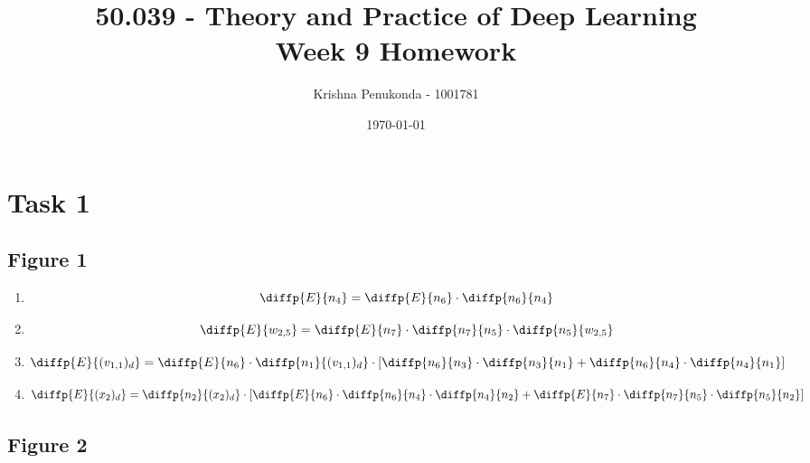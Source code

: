 \documentclass[9pt]{paper}
\title{
	50.039 -  Theory and Practice of Deep Learning\\
	Week 9 Homework
}
\author{Krishna Penukonda - 1001781}
\date{\today}
\begin{document}
\maketitle

\section*{Task 1}

\subsection*{Figure 1}

\begin{enumerate}

\item
\begin{equation*}
\diffp{E}{{n_4}} = \diffp{E}{{n_6}} \cdot \diffp{{n_6}}{{n_4}}
\end{equation*}

\item
\begin{equation*}
\diffp{E}{{w_{2,5}}} = \diffp{E}{{n_7}} \cdot \diffp{{n_7}}{{n_5}} \cdot \diffp{{n_5}}{{w_{2,5}}}
\end{equation*}

\item
\begin{equation*}
\diffp{E}{{(v_{1,1})_d}} = \diffp{E}{{n_6}} \cdot \diffp{{n_1}}{{(v_{1,1})_d}} \cdot \left[\diffp{n_6}{{n_3}} \cdot \diffp{n_3}{{n_1}} + \diffp{n_6}{{n_4}} \cdot \diffp{n_4}{{n_1}}\right]
\end{equation*}

\item
\begin{equation*}
\diffp{E}{{(x_2)_d}} = \diffp{n_2}{{(x_2)_d}} \cdot \left[\diffp{E}{{n_6}} \cdot \diffp{n_6}{{n_4}} \cdot \diffp{n_4}{{n_2}} + \diffp{E}{{n_7}} \cdot \diffp{n_7}{{n_5}} \cdot \diffp{n_5}{{n_2}}\right]
\end{equation*}

\end{enumerate}

\subsection*{Figure 2}
\end{document}
